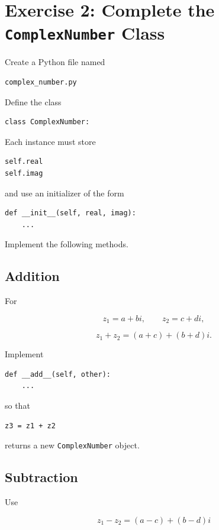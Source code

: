 \documentclass{article}
\begin{document}
\section{Exercise 2: Complete the \\ \texttt{ComplexNumber} Class}

Create a Python file named

\begin{verbatim}
complex_number.py
\end{verbatim}

Define the class

\begin{verbatim}
class ComplexNumber:
\end{verbatim}

Each instance must store

\begin{verbatim}
self.real
self.imag
\end{verbatim}

and use an initializer of the form

\begin{verbatim}
def __init__(self, real, imag):
    ...
\end{verbatim}

Implement the following methods.

\subsection*{Addition}

For

\[
z_1=a+bi,
\qquad
z_2=c+di,
\]

\[
z_1+z_2=(a+c)+(b+d)i.
\]

Implement

\begin{verbatim}
def __add__(self, other):
    ...
\end{verbatim}

so that

\begin{verbatim}
z3 = z1 + z2
\end{verbatim}

returns a new \texttt{ComplexNumber} object.

\subsection*{Subtraction}

Use

\[
z_1-z_2=(a-c)+(b-d)i
\]
\end{document}
